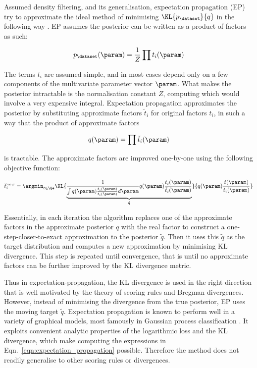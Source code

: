 Assumed density filtering, and its generalisation, expectation propagation (EP) try to approximate the ideal method of minimising $\KL{p_{\dataset}}{q}$ in the following way \citep{Minka2001thesis}. EP assumes the posterior can be written as a product of factors as such: 

\begin{equation}
	p_{\dataset}(\param) = \frac{1}{Z} \prod t_i(\param)
\end{equation}

The terms $t_i$ are assumed simple, and in most cases depend only on a few components of the multivariate parameter vector $\param$. What makes the posterior intractable is the normalisation constant $Z$, computing which would involve a very expensive integral. Expectation propagation approximates the posterior by substituting approximate factors $\tilde{t}_i$ for original factors $t_i$, in such a way that the product of approximate factors

\begin{equation}
	q(\param) = \prod \tilde{t}_i(\param)
\end{equation}

is tractable. The approximate factors are improved one-by-one using the following objective function:

\begin{equation}
	\tilde{t}_i^{new} = \argmin_{t \in \Qe} \KL{\underbrace{\frac{1}{\int q(\param)\frac{t_i(\param)}{\tilde{t}_i(\param)} d\param}q(\param)\frac{t_i(\param)}{\tilde{t}_i(\param)}}_{\tilde{q}}}{q(\param)\frac{t(\param)}{t_i(\param)}} \label{eqn:expectation_propagation}
\end{equation}

Essentially, in each iteration the algorithm replaces one of the approximate factors in the approximate posterior $q$ with the real factor to construct a one-step-closer-to-exact approximation to the posterior $\tilde{q}$. Then it uses this $\tilde{q}$ as the target distribution and computes a new approximation by minimising KL divergence. This step is repeated until convergence, that is until no approximate factors can be further improved by the KL divergence metric.

Thus in expectation-propagation, the KL divergence is used in the right direction that is well motivated by the theory of scoring rules and Bregman divergences. However, instead of minimising the divergence from the true posterior, EP uses the moving target $\tilde{q}$. Expectation propagation is known to perform well in a variety of graphical models, most famously in Gaussian process classification \citep{Nickisch2008}. It exploits convenient analytic properties of the logarithmic loss and the KL divergence, which make computing the expressions in Eqn.\ \eqref{eqn:expectation_propagation} possible. Therefore the method does not readily generalise to other scoring rules or divergences.

